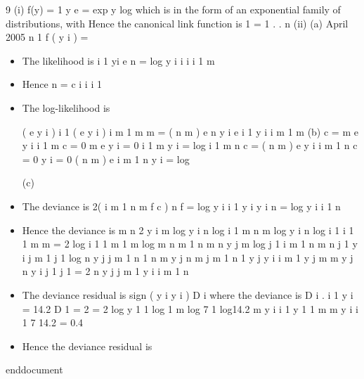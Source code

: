 \documentclass[a4paper,12pt]{article}
\begin{document}
9
(i)
f(y) =
1
y
e
= exp
y
log
which is in the form of an exponential family of distributions, with
Hence the canonical link function is
1
=
1
.
.
n
(ii)
(a)
April 2005
n
1
f ( y i ) =
\begin{itemize}
\item The likelihood is
i 1
yi
e
n
=
log
y i
i
i
i 1
m
\item Hence
n
=
c
i
i
i 1
\item The log-likelihood is

(
e
y i )
i 1
(
e y i )
i m 1
m
m
=
( n m )
e
n
y i
e
i 1
y i
i m 1
m
(b)
c
= m e
y i
i 1
m
c
= 0
m e
y i = 0
i 1
m
y i
= log
i 1
m
n
c
= ( n m ) e
y i
i m 1
n
c
= 0
y i = 0
( n m ) e
i m 1
n
y i
= log

(c)
\item The deviance is 2(
i m 1
n m
f
c )
n
f
=
log y i
i 1
y i
y i
n
=
log y i
i 1
n
\item Hence the deviance is
m
n
2
y i
m
log y i
n
log
i 1
m
n
m
log y i
n
log
i 1
i 1
1
m
m
= 2
log
i 1
1
m
1
m
log
m
n m
1
n m
n
y j
m
log
j 1
i m 1
n m
n
j 1
y i
j m 1
j 1
log
n
y j
j m 1
n
1
n m
y j
n m
j m 1
n
1
y j
y i
i m 1
y j
m
m
y j
n
y i
j 1
j 1
= 2
n
y j
j m 1
y i
i m 1
n
\item The deviance residual is sign ( y i
y i ) D i where the deviance is
D i .
i 1
y i = 14.2
D 1 = 2
= 2
log y 1 1 log
1
m
log 7 1 log14.2
m
y i
i 1
y 1
1
m
m
y i
i 1
7
14.2
= 0.4
\item Hence the deviance residual is
\end{itemize}
end{document}
\end{document}
